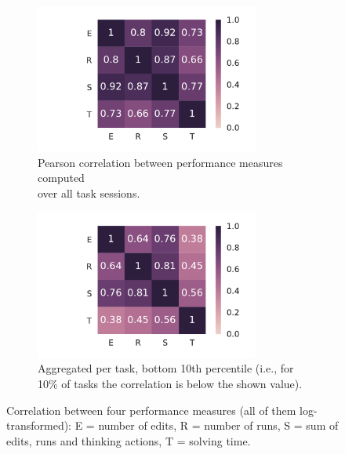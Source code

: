 \begin{figure}[htb]
\centering
\begin{subfigure}{.49\textwidth}
\centering
\includegraphics[height=49mm,trim={34mm 0 11mm 0},clip]{img/performance-corr-ts}
\caption{Pearson correlation between performance measures computed\\over all task sessions.}
\label{fig:performance-corrs-ts}
\end{subfigure}
\begin{subfigure}{.49\textwidth}
\centering
\includegraphics[height=49mm,trim={34mm 0 11mm 0},clip]{img/performance-corr-tasks-q10}
\caption{Aggregated per task, bottom 10th percentile
  (i.e., for 10\% of tasks the correlation is below the shown value).}
\label{fig:performance-corrs-p10}
\end{subfigure}
\caption{Correlation between four performance measures
(all of them log-transformed):
E = number of edits, R = number of runs, S = sum of edits, runs and thinking actions,
T = solving time.}
\label{fig:performance-corrs}
\end{figure}


